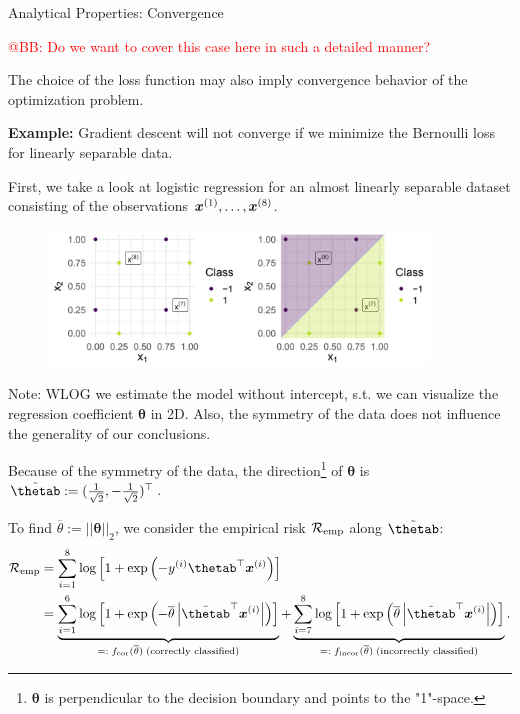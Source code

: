 \begin{vbframe}{Analytical Properties: Convergence}

\textcolor{red}{@BB: Do we want to cover this case here in such a detailed manner? }

The choice of the loss function may also imply convergence behavior of the optimization problem. 

\vspace*{0.2cm}

\textbf{Example: } Gradient descent will not converge if we minimize the Bernoulli loss for linearly separable data. 

\vspace*{0.2cm}

First, we take a look at logistic regression for an almost linearly separable dataset consisting of the observations $\bm{x}^{(1)}, \dots, \bm{x}^{(8)}$.
\vfill

\begin{figure}
\includegraphics[width=0.9\textwidth]{figure_man/undet-problem01.png}\\
\end{figure}


Note: WLOG we estimate the
model without intercept, s.t. we can visualize the regression coefficient 
$\bm{\theta}$ in 2D. Also, the symmetry of the data does not influence the generality of our conclusions.

\vspace*{0.2cm}

Because of the symmetry of the data, the direction\footnote[frame]{$\bm{\theta}$ is perpendicular to the decision boundary and points to the "1"-space.} of $\bm{\theta}$ is $\tilde\thetab := (\frac{1}{\sqrt{2}}, -\frac{1}{\sqrt{2}})^\top$.

\medskip

To find $\overline{\theta} := ||\bm{\theta}||_2$, we consider the empirical risk $\mathcal{R}_{\text{emp}}$ along $\tilde\thetab$:
\begin{align*}
\riske &= \sum^8_{i=1} \log \left[1 + \exp \left(-y^{(i)}\thetab^\top \xv^{(i)}\right)\right] \\
&= \underbrace{\sum^6_{i=1} \log \left[1 + \exp \left(- \overline{\theta} \left|\tilde{\thetab}^\top \xv^{(i)}\right|\right)\right]}_{=: \; f_{\text{cor}}(\overline{\theta}) \;\text{(correctly classified)}} +
\underbrace{\sum^8_{i=7}\log \left[1 + \exp \left( \overline{\theta} \left| \tilde{\thetab}^\top \xv^{(i)}\right|\right)\right]}_{=:\; f_{\text{incor}}(\overline{\theta}) \;\text{(incorrectly classified)}}.
\end{align*}

\end{vbframe}



